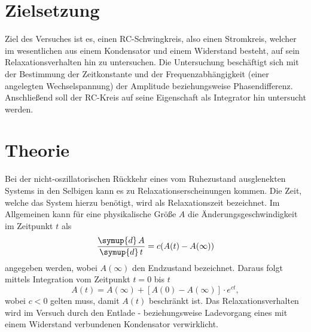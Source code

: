 \section{Zielsetzung}
Ziel des Versuches ist es, einen RC-Schwingkreis, also einen Stromkreis, welcher im wesentlichen aus einem Kondensator und einem Widerstand 
besteht, auf sein Relaxationsverhalten hin zu untersuchen. Die Untersuchung beschäftigt sich mit der Bestimmung der Zeitkonstante
und der Frequenzabhängigkeit (einer angelegten Wechselspannung) der Amplitude beziehungsweise Phasendifferenz. Anschließend soll der
RC-Kreis auf seine Eigenschaft als Integrator hin untersucht werden.

\section{Theorie}
\label{sec:Theorie}

Bei der nicht-oszillatorischen Rückkehr eines vom 
Ruhezustand ausglenekten Systems in den Selbigen
kann es zu Relaxationserscheinungen kommen. Die Zeit,
welche das System hierzu benötigt, wird als 
Relaxationszeit bezeichnet. Im Allgemeinen kann 
für eine physikalische Größe $A$ die Änderungsgeschwindigkeit
im Zeitpunkt $t$ als 
\begin{equation}
\label{eqn:aenderungsgeschwindigkeit}
\frac{\symup{d} \, A} {\symup{d} \, t} = c (A(t) - A(\infty))
\end{equation}
angegeben werden, wobei $A(\infty)$ den Endzustand bezeichnet. 
Daraus folgt mittels Integration vom Zeitpunkt $t = 0$ bis $t$
\begin{equation}
\label{eqn:A}
A(t) = A(\infty) + [ A(0) - A(\infty)] \cdot e^{ct},
\end{equation}
wobei $c < 0$ gelten muss, damit $A(t)$ beschränkt ist.
Das Relaxationsverhalten wird im Versuch durch den 
Entlade - beziehungsweise Ladevorgang eines mit einem 
Widerstand verbundenen Kondensator verwirklicht.


